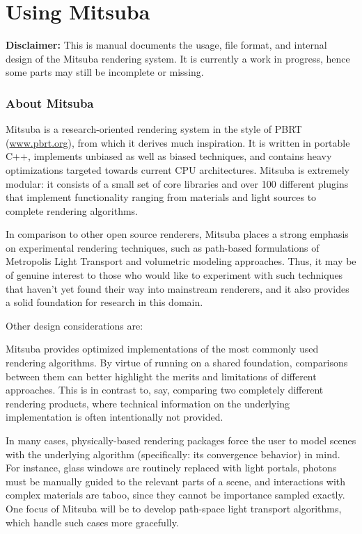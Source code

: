 \part{Using Mitsuba}
\textbf{Disclaimer:} This is manual documents the usage, file format, and
internal design of the Mitsuba rendering system. It is currently a work 
in progress, hence some parts may still be incomplete or missing.

\section{About Mitsuba}
Mitsuba is a research-oriented rendering system in the style of PBRT 
(\url{www.pbrt.org}), from which it derives much inspiration.
It is written in portable C++, implements unbiased as well 
as biased techniques, and contains heavy optimizations targeted 
towards current CPU architectures. 
Mitsuba is extremely modular: it consists of a small set of core libraries 
and over 100 different plugins that implement functionality ranging 
from materials and light sources to complete rendering algorithms.

In comparison to other open source renderers, Mitsuba places a strong 
emphasis on experimental rendering techniques, such as path-based 
formulations of Metropolis Light Transport and volumetric
modeling approaches. Thus, it may be of genuine interest to those who
would like to experiment with such techniques that haven't yet found 
their way into mainstream renderers, and it also provides a solid 
foundation for research in this domain.

Other design considerations are:

Mitsuba provides optimized implementations of the most commonly 
used rendering algorithms. By virtue of running on a shared foundation, comparisons between them can
better highlight the merits and limitations of different approaches. This is in contrast to, say, 
comparing two completely different rendering products, where technical information on the underlying 
implementation is often intentionally not provided.

In many cases, physically-based rendering packages force the user to model scenes with the underlying 
algorithm (specifically: its convergence behavior) in mind. For instance, glass windows are routinely 
replaced with light portals, photons must be manually guided to the relevant parts of a scene, and 
interactions with complex materials are taboo, since they cannot be importance sampled exactly. 
One focus of Mitsuba will be to develop path-space light transport algorithms, which handle such 
cases more gracefully.

